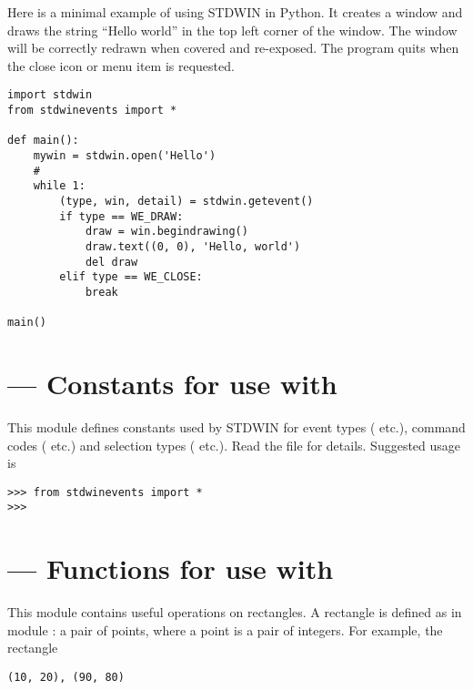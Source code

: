 Here is a minimal example of using STDWIN in Python.
It creates a window and draws the string ``Hello world'' in the top
left corner of the window.
The window will be correctly redrawn when covered and re-exposed.
The program quits when the close icon or menu item is requested.

\begin{verbatim}
import stdwin
from stdwinevents import *

def main():
    mywin = stdwin.open('Hello')
    #
    while 1:
        (type, win, detail) = stdwin.getevent()
        if type == WE_DRAW:
            draw = win.begindrawing()
            draw.text((0, 0), 'Hello, world')
            del draw
        elif type == WE_CLOSE:
            break

main()
\end{verbatim}


\section{ ---
         Constants for use with }



This module defines constants used by STDWIN for event types
( etc.), command codes ( etc.)
and selection types ( etc.).
Read the file for details.
Suggested usage is

\begin{verbatim}
>>> from stdwinevents import *
>>> 
\end{verbatim}


\section{ ---
         Functions for use with }



This module contains useful operations on rectangles.
A rectangle is defined as in module :
a pair of points, where a point is a pair of integers.
For example, the rectangle

\begin{verbatim}
(10, 20), (90, 80)
\end{verbatim}


